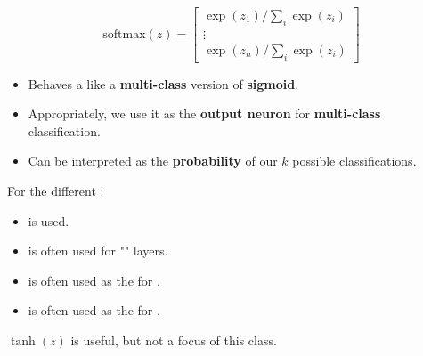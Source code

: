 \begin{itemize}
                \begin{equation}
                    \text{softmax}(z) =
                    \begin{bmatrix}
                        \exp(z_1) / \sum_{i} \exp(z_i) \\
                        \vdots \\
                        \exp(z_n) / \sum_{i} \exp(z_i)
                    \end{bmatrix}
                \end{equation}
                
                \begin{itemize}
                    \item Behaves a like a \textbf{multi-class} version of \textbf{sigmoid}.
                    
                    \item Appropriately, we use it as the \textbf{output neuron} for \textbf{multi-class} classification.
                    
                    \item Can be interpreted as the \textbf{probability} of our $k$ possible classifications.
                \end{itemize}
        \end{itemize}
        
    \begin{concept}
        For the different :
        
        \begin{itemize}
            \item {} is  used.
            
            \item {} is often used for "" layers.
            
            \item {} is often used as the  for .
            
            \item {} is often used as the  for .
        \end{itemize}
        $\tanh(z)$ is useful, but not a focus of this class.
    \end{concept}
    
\pagebreak
